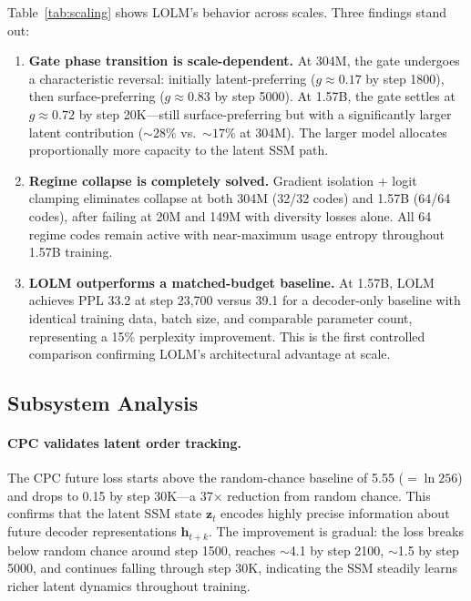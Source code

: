 \documentclass{article}
\begin{document}
Table~\ref{tab:scaling} shows LOLM's behavior across scales. Three findings
stand out:

\begin{enumerate}
    \item \textbf{Gate phase transition is scale-dependent.} At 304M, the gate
    undergoes a characteristic reversal: initially latent-preferring ($g
    \approx 0.17$ by step 1800), then surface-preferring ($g \approx 0.83$
    by step 5000). At 1.57B, the gate settles at $g \approx 0.72$ by step
    20K---still surface-preferring but with a significantly larger latent
    contribution (${\sim}28\%$ vs.\ ${\sim}17\%$ at 304M). The larger model
    allocates proportionally more capacity to the latent SSM path.

    \item \textbf{Regime collapse is completely solved.} Gradient isolation +
    logit clamping eliminates collapse at both 304M (32/32 codes) and 1.57B
    (64/64 codes), after failing at 20M and 149M with diversity losses alone.
    All 64 regime codes remain active with near-maximum usage entropy
    throughout 1.57B training.

    \item \textbf{LOLM outperforms a matched-budget baseline.} At 1.57B, LOLM
    achieves PPL 33.2 at step 23{,}700 versus 39.1 for a decoder-only baseline
    with identical training data, batch size, and comparable parameter count,
    representing a 15\% perplexity improvement. This is the first controlled
    comparison confirming LOLM's architectural advantage at scale.
\end{enumerate}

\subsection{Subsystem Analysis}
\label{sec:subsystem}

\paragraph{CPC validates latent order tracking.}
The CPC future loss starts above the random-chance baseline of 5.55
($= \ln 256$) and drops to 0.15 by step 30K---a 37$\times$ reduction
from random chance. This confirms that the latent SSM state $\mathbf{z}_t$
encodes highly precise information about future decoder representations
$\mathbf{h}_{t+k}$. The improvement is gradual: the loss breaks below random
chance around step 1500, reaches ${\sim}$4.1 by step 2100, ${\sim}$1.5 by step
5000, and continues falling through step 30K, indicating the SSM steadily
learns richer latent dynamics throughout training.
\end{document}
